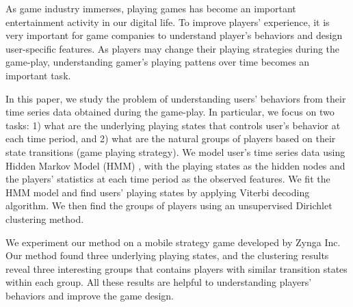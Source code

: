 As game industry immerses, playing games has become an important entertainment activity in our digital life. 
To improve players' experience, it is very important for game companies to understand 
player's behaviors and design user-specific features. As players may change their playing strategies 
during the game-play, understanding gamer's playing pattens over time becomes an important task. 

In this paper, we study the problem of understanding users' behaviors from their time series data obtained
during the game-play.  In particular, we focus on two tasks: 
1) what are the underlying playing states that controls user's behavior at each time period, 
and 2) what are the natural groups of players based on their state transitions (game playing strategy). 
We model user's time series data using Hidden Markov Model (HMM) \cite{hmm}, with the playing states as 
the hidden nodes and the players' statistics at each time period as the observed features. 
We fit the HMM model and find users' playing states by applying Viterbi decoding algorithm. 
We then find the groups of players using an unsupervised Dirichlet clustering method.

We experiment our method on a mobile strategy game developed by Zynga Inc. %
Our method found three underlying playing states, and  the clustering results reveal three 
interesting groups that contains players with similar transition states within each group.
All these results are helpful to understanding players' behaviors and improve the game design. 


